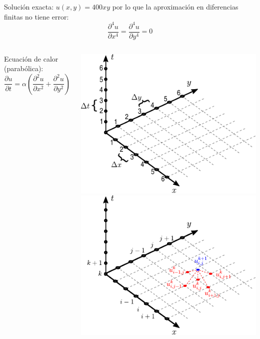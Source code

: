 \documentclass[9pt, aspectratio=169]{beamer}
\begin{document}
\begin{frame}
Solución exacta: $u(x, y) = 400 xy$ por lo que la aproximación en diferencias finitas no tiene error:
\[ \frac{\partial^4 u}{\partial x^4} = \frac{\partial^4 u}{\partial y^4} = 0 \]
\end{frame}

\begin{frame}
    \begin{columns}[t]
Ecuación de calor (parabólica):
\[ \frac{\partial u}{\partial t} = \alpha \left(\frac{\partial^2 u}{\partial x^2} + \frac{\partial^2 u}{\partial y^2}\right) \] \pause
  \begin{center}
  \begin{overprint}
   \includegraphics[width=1.0\textwidth]{figs/grilla}
   \includegraphics[width=1.0\textwidth]{figs/grilla-stencil}
  \end{overprint}
  \end{center}


\end{columns}
\end{frame}
\end{document}

